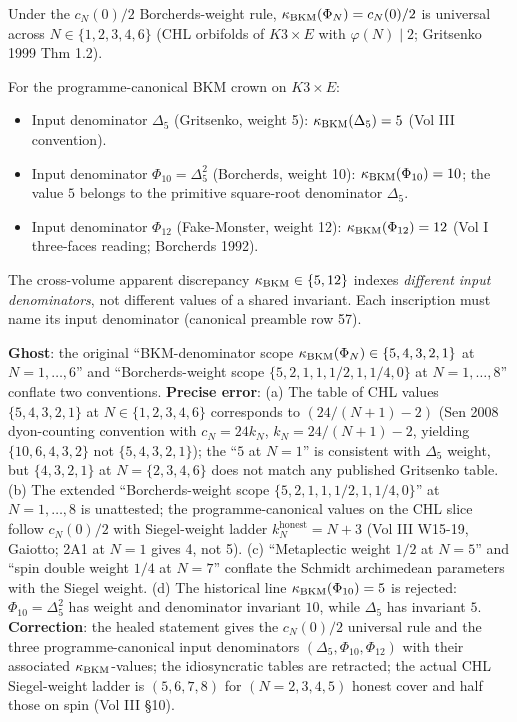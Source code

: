 \begin{theorem}\ClaimStatusHealed
\label{wn:thm:healed-universal-kBKM}
Under the $c_N(0)/2$ Borcherds-weight rule, $\kappa_{\mathrm{BKM}}(\Phi_N) = c_N(0)/2$ is universal across $N \in \{1, 2, 3, 4, 6\}$ (CHL orbifolds of $K3 \times E$ with $\varphi(N) \mid 2$; Gritsenko 1999 Thm 1.2).

For the programme-canonical BKM crown on $K3 \times E$:
\begin{itemize}
\item Input denominator $\Delta_5$ (Gritsenko, weight 5): $\kappa_{\mathrm{BKM}}(\Delta_5) = 5$ (Vol III convention).
\item Input denominator $\Phi_{10} = \Delta_5^2$ (Borcherds, weight 10): $\kappa_{\mathrm{BKM}}(\Phi_{10}) = 10$; the value $5$ belongs to the primitive square-root denominator $\Delta_5$.
\item Input denominator $\Phi_{12}$ (Fake-Monster, weight 12): $\kappa_{\mathrm{BKM}}(\Phi_{12}) = 12$ (Vol I three-faces reading; Borcherds 1992).
\end{itemize}
The cross-volume apparent discrepancy $\kappa_{\mathrm{BKM}} \in \{5, 12\}$ indexes \emph{different input denominators}, not different values of a shared invariant. Each inscription must name its input denominator (canonical preamble row 57).
\end{theorem}

\textbf{Ghost}: the original ``BKM-denominator scope $\kappa_{\mathrm{BKM}}(\Phi_N) \in \{5, 4, 3, 2, 1\}$ at $N = 1, \ldots, 6$'' and ``Borcherds-weight scope $\{5, 2, 1, 1, 1/2, 1, 1/4, 0\}$ at $N = 1, \ldots, 8$'' conflate two conventions. \textbf{Precise error}: (a) The table of CHL values $\{5, 4, 3, 2, 1\}$ at $N \in \{1, 2, 3, 4, 6\}$ corresponds to $(24/(N+1) - 2)$ (Sen 2008 dyon-counting convention with $c_N = 24 k_N$, $k_N = 24/(N + 1) - 2$, yielding $\{10, 6, 4, 3, 2\}$ not $\{5, 4, 3, 2, 1\}$); the ``$5$ at $N = 1$'' is consistent with $\Delta_5$ weight, but $\{4, 3, 2, 1\}$ at $N = \{2, 3, 4, 6\}$ does not match any published Gritsenko table. (b) The extended ``Borcherds-weight scope $\{5, 2, 1, 1, 1/2, 1, 1/4, 0\}$'' at $N = 1, \ldots, 8$ is unattested; the programme-canonical values on the CHL slice follow $c_N(0)/2$ with Siegel-weight ladder $k_N^{\mathrm{honest}} = N + 3$ (Vol III W15-19, Gaiotto; 2A1 at $N = 1$ gives 4, not 5). (c) ``Metaplectic weight $1/2$ at $N = 5$'' and ``spin double weight $1/4$ at $N = 7$'' conflate the Schmidt archimedean parameters with the Siegel weight. (d) The historical line $\kappa_{\mathrm{BKM}}(\Phi_{10})=5$ is rejected: $\Phi_{10}=\Delta_5^2$ has weight and denominator invariant $10$, while $\Delta_5$ has invariant $5$. \textbf{Correction}: the healed statement gives the $c_N(0)/2$ universal rule and the three programme-canonical input denominators $(\Delta_5, \Phi_{10}, \Phi_{12})$ with their associated $\kappa_{\mathrm{BKM}}$-values; the idiosyncratic tables are retracted; the actual CHL Siegel-weight ladder is $(5, 6, 7, 8)$ for $(N = 2, 3, 4, 5)$ honest cover and half those on spin (Vol III \S10).


